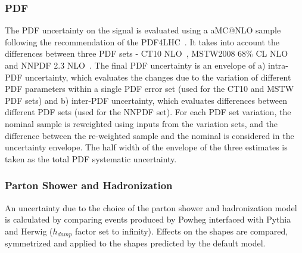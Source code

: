 \subsubsection{PDF}
The PDF uncertainty on the \ttbar signal is evaluated using a {\sc aMC$@$NLO} \ttbar sample following the
recommendation of the PDF4LHC~\cite{ref:pdf4lhc}. It takes into account
the differences between three PDF sets - CT10 NLO~\cite{ct10},
MSTW2008 68\% CL NLO~\cite{mstw1,mstw2} and NNPDF 2.3 NLO~\cite{nnpdf}.
The final PDF uncertainty is an envelope of a) intra-PDF uncertainty,
which evaluates the changes due to the variation of different PDF parameters
within a single PDF error set (used for the CT10 and MSTW PDF sets) and b) inter-PDF uncertainty, which evaluates
differences between different PDF sets (used for the NNPDF set). For each PDF set variation, the nominal sample is reweighted using inputs from the variation sets, and the difference between the re-weighted sample and the nominal is considered in the uncertainty envelope. %
The half width of the envelope of the three estimates is taken as the total PDF systematic uncertainty. %


\subsubsection{Parton Shower and Hadronization}
An uncertainty due to the choice of the parton shower and hadronization model
is calculated by comparing events produced by {\sc Powheg} interfaced with {\sc Pythia}
and {\sc Herwig} ($h_{damp}$ factor set to infinity). Effects on the shapes are compared, symmetrized and applied to the
shapes predicted by the default model.

